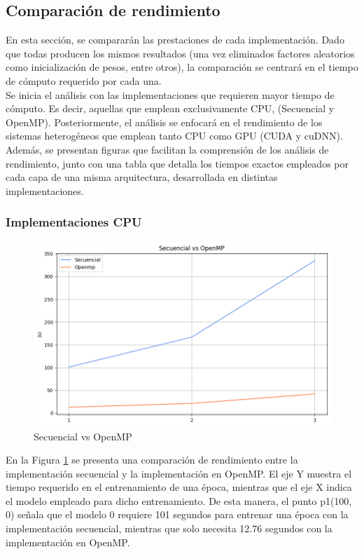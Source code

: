 \subsection{Comparación de rendimiento}

En esta sección, se compararán las prestaciones de cada implementación. Dado que todas producen los mismos resultados (una vez eliminados factores aleatorios como inicialización de pesos, entre otros), la comparación se centrará en el tiempo de cómputo requerido por cada una. \\
Se inicia el análisis con las implementaciones que requieren mayor tiempo de cómputo. Es decir, aquellas que emplean exclusivamente CPU, (Secuencial y OpenMP). Posteriormente, el análisis se enfocará en el rendimiento de los sistemas heterogéneos que emplean tanto CPU como GPU (CUDA y cuDNN). \\
Además, se presentan figuras que facilitan la comprensión  de los análisis de rendimiento, junto con una tabla que detalla los tiempos exactos empleados por cada capa de una misma arquitectura, desarrollada en distintas implementaciones.

\subsubsection{Implementaciones CPU}

\begin{figure}[H]
	\centering
	\includegraphics[scale=0.5]{imagenes/sec_openmp.png}  
	\caption{Secuencial vs OpenMP}
	\label{fig:sec_openmp}
\end{figure}

En la Figura \ref{fig:sec_openmp} se presenta una comparación de rendimiento entre la implementación secuencial y la implementación en OpenMP. El eje Y muestra el tiempo requerido en el entrenamiento de una época, mientras que el eje X indica el modelo empleado para dicho entrenamiento. De esta manera, el punto p1(100, 0) señala que el modelo 0 requiere 101 segundos para entrenar una época con la implementación secuencial, mientras que solo necesita 12.76 segundos con la implementación en OpenMP.

